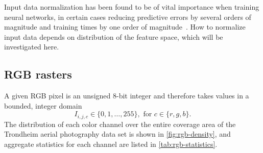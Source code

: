 Input data normalization has been found to be of vital importance when training neural networks, in certain cases reducing predictive errors by several orders of magnitude and training times by one order of magnitude~\cite{input_normalization_1997}.
How to normalize input data depends on distribution of the feature space, which will be investigated here.

\subsection{RGB rasters}

A given RGB pixel is an unsigned 8-bit integer and therefore takes values in a bounded, integer domain
%
\begin{equation*}
  I_{i,j,c} \in \{0, 1, \ldots, 255\}, \text{ for } c \in \{r, g, b\}.
\end{equation*}
%
The distribution of each color channel over the entire coverage area of the Trondheim aerial photography data set is shown in \cref{fig:rgb-density}, and aggregate statistics for each channel are listed in \cref{tab:rgb-statistics}.

\begin{figure}[H]
  \begin{floatrow}
    \hspace{-2.5em}
  \end{floatrow}
\end{figure}

